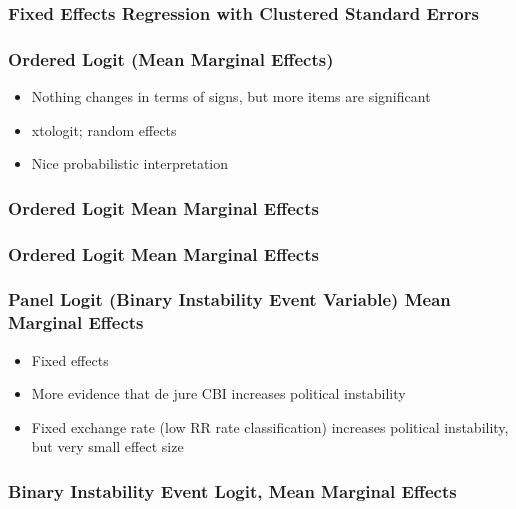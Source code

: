 \documentclass{beamer}
\begin{document}
    \begin{frame}
        \frametitle{Fixed Effects Regression with Clustered Standard Errors}
        {
            \let\oldcentering\centering
            \renewcommand\centering{\tiny\oldcentering}
            
        }
    \end{frame}

    \begin{frame}
        \frametitle{Ordered Logit (Mean Marginal Effects)}
        \begin{itemize}
            \item Nothing changes in terms of signs, but more items are significant
            \item xtologit; random effects
            \item Nice probabilistic interpretation
        \end{itemize}
    \end{frame}

    \begin{frame}
        \frametitle{Ordered Logit Mean Marginal Effects}
        {
            \let\oldcentering\centering
            \renewcommand\centering{\tiny\oldcentering}
            
        }
    \end{frame}

    \begin{frame}
        \frametitle{Ordered Logit Mean Marginal Effects}
        {
            \let\oldcentering\centering
            \renewcommand\centering{\tiny\oldcentering}
            
        }
    \end{frame}

    \begin{frame}
        \frametitle{Panel Logit (Binary Instability Event Variable) Mean Marginal Effects}
        \begin{itemize}
            \item Fixed effects
            \item More evidence that de jure CBI increases political instability
            \item Fixed exchange rate (low RR rate classification) increases political instability, but very small effect size
        \end{itemize}
    \end{frame}

    \begin{frame}
        \frametitle{Binary Instability Event Logit, Mean Marginal Effects}
        {
            \let\oldcentering\centering
            \renewcommand\centering{\tiny\oldcentering}
            
        }
    \end{frame}
\end{document}
